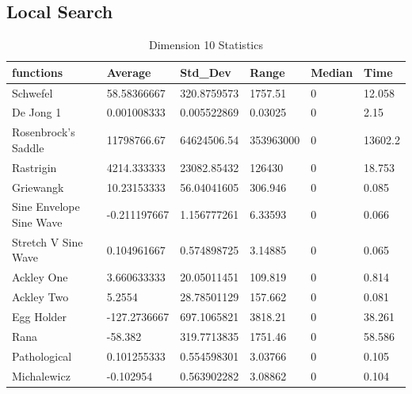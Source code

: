 \documentclass[12pt]{article}
\begin{document}
		\subsection{Local Search}
		\begin{table}[h]
			\centering
			\caption{Dimension 10 Statistics}
			\begin{tabular}{llllll} 
				\hline
				\textbf{functions}       & \textbf{Average} & \textbf{Std\_Dev} & \textbf{Range} & \textbf{Median} & \textbf{Time}  \\ 
				\hline
				Schwefel                & 58.58366667      & 320.8759573       & 1757.51        & 0               & 12.058         \\
				De Jong 1               & 0.001008333      & 0.005522869       & 0.03025        & 0               & 2.15           \\
				Rosenbrock's Saddle     & 11798766.67      & 64624506.54       & 353963000      & 0               & 13602.2        \\
				Rastrigin               & 4214.333333      & 23082.85432       & 126430         & 0               & 18.753         \\
				Griewangk               & 10.23153333      & 56.04041605       & 306.946        & 0               & 0.085          \\
				Sine Envelope Sine Wave & -0.211197667     & 1.156777261       & 6.33593        & 0               & 0.066          \\
				Stretch V Sine Wave     & 0.104961667      & 0.574898725       & 3.14885        & 0               & 0.065          \\
				Ackley One              & 3.660633333      & 20.05011451       & 109.819        & 0               & 0.814          \\
				Ackley Two              & 5.2554           & 28.78501129       & 157.662        & 0               & 0.081          \\
				Egg Holder              & -127.2736667     & 697.1065821       & 3818.21        & 0               & 38.261         \\
				Rana                    & -58.382          & 319.7713835       & 1751.46        & 0               & 58.586         \\
				Pathological            & 0.101255333      & 0.554598301       & 3.03766        & 0               & 0.105          \\
				Michalewicz             & -0.102954        & 0.563902282       & 3.08862        & 0               & 0.104          \\

\end{tabular}
\end{table}
\end{document}

